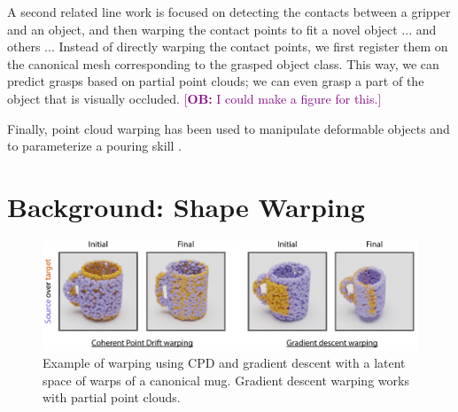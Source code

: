 \documentclass{article}
\newcommand{\ob}[1]{\textcolor{purple}{[\textbf{OB:} #1]}}
\begin{document}
A second related line work is focused on detecting the contacts between a gripper and an object, and then warping the contact points to fit a novel object \cite{li07datadriven,benamor12generalization,hillenbrand12transferring,jakel12learning,stouraitis15functional,rodriguez18learning,pavlichenko19autonomous,tian19transferring} ... and others ... Instead of directly warping the contact points, we first register them on the canonical mesh corresponding to the grasped object class. This way, we can predict grasps based on partial point clouds; we can even grasp a part of the object that is visually occluded. \ob{I could make a figure for this.}

Finally, point cloud warping has been used to manipulate deformable objects \cite{lee15learning,schulman16learning} and to parameterize a pouring skill \cite{brandi14generalizing}.



\section{Background: Shape Warping}
\label{sec:background}

\begin{figure}
    \centering
    \includegraphics[width=\textwidth]{figures/warping.pdf}
    \caption{Example of warping using CPD and gradient descent with a latent space of warps of a canonical mug. Gradient descent warping works with partial point clouds.}
    \label{fig:warping}
\end{figure}
\end{document}
